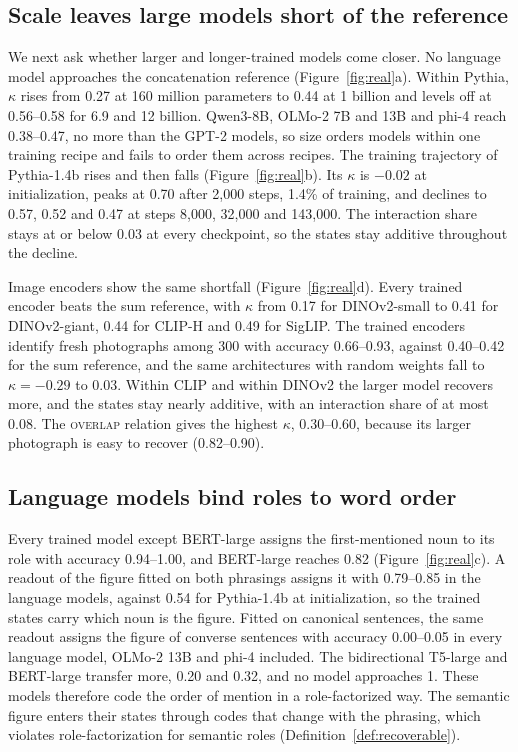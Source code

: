 \subsection{Scale leaves large models short of the reference}
\label{sec:llm}

We next ask whether larger and longer-trained models come closer. No language model approaches the concatenation reference (Figure~\ref{fig:real}a). Within Pythia, $\kappa$ rises from 0.27 at 160 million parameters to 0.44 at 1 billion and levels off at 0.56--0.58 for 6.9 and 12 billion. Qwen3-8B, OLMo-2 7B and 13B and phi-4 reach 0.38--0.47, no more than the GPT-2 models, so size orders models within one training recipe and fails to order them across recipes. The training trajectory of Pythia-1.4b rises and then falls (Figure~\ref{fig:real}b). Its $\kappa$ is $-0.02$ at initialization, peaks at 0.70 after 2{,}000 steps, 1.4\% of training, and declines to 0.57, 0.52 and 0.47 at steps 8{,}000, 32{,}000 and 143{,}000. The interaction share stays at or below 0.03 at every checkpoint, so the states stay additive throughout the decline.

\label{sec:vision}Image encoders show the same shortfall (Figure~\ref{fig:real}d). Every trained encoder beats the sum reference, with $\kappa$ from 0.17 for DINOv2-small to 0.41 for DINOv2-giant, 0.44 for CLIP-H and 0.49 for SigLIP. The trained encoders identify fresh photographs among 300 with accuracy 0.66--0.93, against 0.40--0.42 for the sum reference, and the same architectures with random weights fall to $\kappa = -0.29$ to $0.03$. Within CLIP and within DINOv2 the larger model recovers more, and the states stay nearly additive, with an interaction share of at most 0.08. The \textsc{overlap} relation gives the highest $\kappa$, 0.30--0.60, because its larger photograph is easy to recover (0.82--0.90).

\subsection{Language models bind roles to word order}
\label{sec:roles}

Every trained model except BERT-large assigns the first-mentioned noun to its role with accuracy 0.94--1.00, and BERT-large reaches 0.82 (Figure~\ref{fig:real}c). A readout of the figure fitted on both phrasings assigns it with 0.79--0.85 in the language models, against 0.54 for Pythia-1.4b at initialization, so the trained states carry which noun is the figure. Fitted on canonical sentences, the same readout assigns the figure of converse sentences with accuracy 0.00--0.05 in every language model, OLMo-2 13B and phi-4 included. The bidirectional T5-large and BERT-large transfer more, 0.20 and 0.32, and no model approaches 1. These models therefore code the order of mention in a role-factorized way. The semantic figure enters their states through codes that change with the phrasing, which violates role-factorization for semantic roles (Definition~\ref{def:recoverable}).

